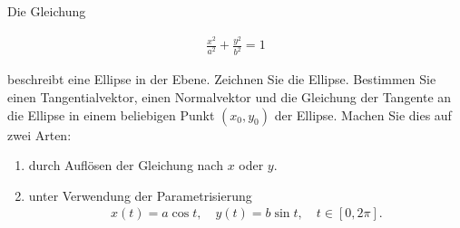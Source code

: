 \begin{exercise}

Die Gleichung

\begin{align*}
  \frac{x^2}{a^2} + \frac{y^2}{b^2} = 1
\end{align*}

beschreibt eine Ellipse in der Ebene.
Zeichnen Sie die Ellipse.
Bestimmen Sie einen Tangentialvektor, einen Normalvektor und die Gleichung der Tangente an die Ellipse in einem beliebigen Punkt $(x_0, y_0)$ der Ellipse.
Machen Sie dies auf zwei Arten:

\begin{enumerate}[label = \textbf{\alph*)}]

  \item durch Auflösen der Gleichung nach $x$ oder $y$.

  \item unter Verwendung der Parametrisierung
  \begin{align*}
    x(t) = a \cos{t},
    \quad
    y(t) = b \sin{t},
    \quad
    t \in [0, 2 \pi].
  \end{align*}

\end{enumerate}

\end{exercise}

